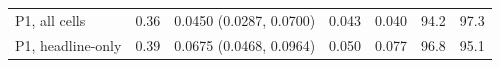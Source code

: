 \begin{tabular}{lrrrrrr}
P1, all cells & 0.36 & 0.0450 (0.0287, 0.0700) & 0.043 & 0.040 & 94.2 & 97.3 \\
P1, headline-only & 0.39 & 0.0675 (0.0468, 0.0964) & 0.050 & 0.077 & 96.8 & 95.1 \\

\end{tabular}
